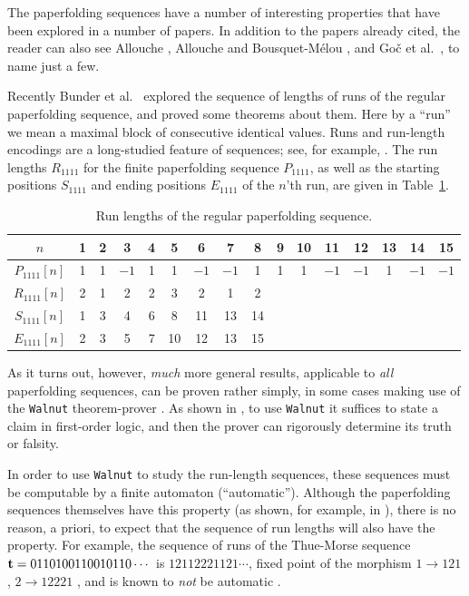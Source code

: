 \documentclass[12pt,reqno]{article}
\begin{document}
The paperfolding sequences have a number of interesting properties
that have been explored in a number of papers.  In addition to the
papers 
\cite{Davis&Knuth:1970,Dekking&MendesFrance&vanderPoorten:1982} already
cited, the reader can also see
Allouche \cite{Allouche:1992},
Allouche and Bousquet-M\'elou 
\cite{Allouche&Bousquet-Melou:1994a,Allouche&Bousquet-Melou:1994b},
and Go\v{c} et al.~\cite{Goc&Mousavi&Schaeffer&Shallit:2015}, to name 
just a few.

Recently Bunder et al.~\cite{Bunder&Bates&Arnold:2024} explored
the sequence of lengths of runs of the regular paperfolding sequence,
and proved some theorems about them.  Here by a ``run'' we mean a maximal
block of consecutive identical values.  Runs and run-length
encodings are a long-studied feature of sequences; see,
for example, \cite{Golomb:1966}.  
The run lengths $R_{1111}$ for the finite paperfolding sequence $P_{1111}$,
as well as the starting positions $S_{1111}$ and ending
positions $E_{1111}$ of the $n$'th run, are
given in Table~\ref{tab2}.  

\begin{table}[htb]
\begin{center}
\begin{tabular}{c|ccccccccccccccc} 
$n$ & 1 & 2 &  3 & 4 & 5 & 6 & 7 & 8 & 9 & 10 & 11 & 12 & 13 & 14 & 15 \\
\hline
$P_{1111} [n] $ & 1& 1&$-1$& 1& 1&$-1$&$-1$& 1& 1& 1&$-1$&$-1$& 1&$-1$&$-1$  \\
$R_{1111} [n] $ & 2&1&2&2&3&2&1&2& & & & & & &   \\
$S_{1111} [n] $ & 1& 3& 4& 6& 8&11&13&14&  &  &  &  &  &  &   \\
$E_{1111} [n] $ & 2& 3& 5& 7&10&12&13&15&  &  &  &  &  &  &   \\
\end{tabular}
\end{center}
\caption{Run lengths of the regular paperfolding sequence.}
\label{tab2}
\end{table}

As it turns out, however, {\it much\/} more general results,
applicable to {\it all\/} paperfolding sequences,
can be proven rather simply, in some cases making use of the
{\tt Walnut} theorem-prover \cite{Mousavi:2016}.  As shown in
\cite{Shallit:2023}, to use {\tt Walnut} it suffices to state a claim in
first-order logic, and then the prover can rigorously determine its truth or
falsity.

In order to use {\tt Walnut} to study the run-length sequences, these
sequences must be computable by a finite automaton (``automatic'').
Although the
paperfolding sequences themselves have this property (as shown,
for example, in \cite{Goc&Mousavi&Schaeffer&Shallit:2015}), 
there is no reason, a priori, to expect that the sequence of run lengths
will also have the property.
For example, the sequence of runs of the Thue-Morse sequence
${\bf t} = 0110100110010110\cdots$ is
$12112221121\cdots$, fixed point of the morphism $1 \rightarrow 121$,
$2 \rightarrow 12221$ \cite{Allouche&Arnold&Berstel&Brlek&Jockusch&Plouffe&Sagan:1995}, and is known to {\it not\/} be automatic \cite{Allouche&Allouche&Shallit:2006}.
\end{document}
